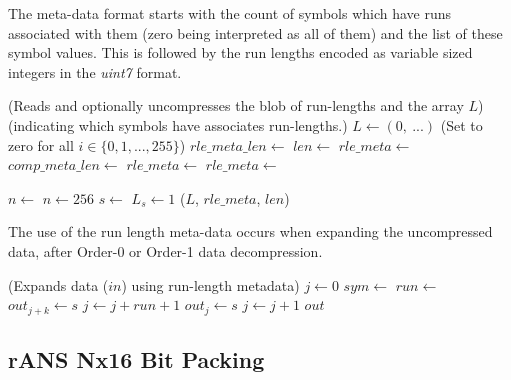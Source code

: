 \documentclass[a4paper]{article}
\begin{document}
The meta-data format starts with the count of symbols which have runs
associated with them (zero being interpreted as all of them) and the
list of these symbol values.  This is followed by the run lengths
encoded as variable sized integers in the \emph{uint7} format.

\begin{algorithmic}[1]
\Statex (Reads and optionally uncompresses the blob of run-lengths and the array $L$)
\Statex (indicating which symbols have associates run-lengths.)
  \State $L \gets (0,\ ...)$ \Comment(Set to zero for all $i \in \{0, 1,
  ..., 255\}$)
  \State $rle\_meta\_len \gets $
  \State $len \gets $ 
    \State $rle\_meta \gets $
  \Else
    \State $comp\_meta\_len \gets $
    \State $rle\_meta \gets $
    \State $rle\_meta \gets
    $
    \EndIf

  \Statex
  \State $n \gets$ 
    \State $n \gets 256$
  \EndIf
    \State $s \gets$ 
    \State $L_s \gets 1$
  \EndFor
  \Statex
  \State \Return ($L$, $rle\_meta$, $len$)
\EndFunction
\end{algorithmic}

The use of the run length meta-data occurs when expanding the
uncompressed data, after Order-0 or Order-1 data decompression.

\begin{algorithmic}[1]
\Statex (Expands data ($in$) using run-length metadata)
  \State $j \gets 0$
    \State $sym \gets$ 
      \State $run \gets$ 
          \State $out_{j+k} \gets s$
      \EndFor
      \State $j \gets j + run + 1$
    \Else
      \State $out_j \gets s$
      \State $j \gets j + 1$
    \EndIf
  \EndFor
  \State \Return $out$
\EndFunction
\end{algorithmic}


\subsection{rANS Nx16 Bit Packing}
\label{sec:ranspack}
\end{document}
